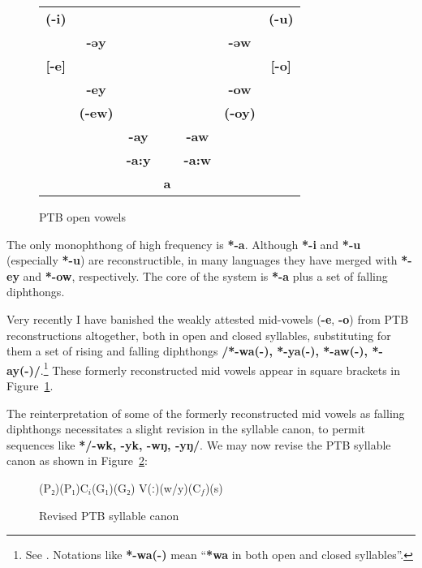 \begin{figure}[h!]
\centering
\begin{tabular}{ccccccc}
\textbf{(-i)} & & & & & & \textbf{(-u)}\\
 & \textbf{-əy} & & & & \textbf{-əw} & \\
\textbf{[-e]} & & & & & & \textbf{[-o]}\\
 & \textbf{-ey} & & & & \textbf{-ow} & \\
 & \textbf{(-ew)} & & & & \textbf{(-oy)} & \\
 & & \textbf{-ay} & & \textbf{-aw} & & \\
 & & \textbf{-a:y} & & \textbf{-a:w} & & \\
 & & & \textbf{a} & & & \\
\end{tabular}
\caption{PTB open vowels}
\label{fig:PTB_vowels}
\end{figure}

The only monophthong of high frequency is \textbf{*-a}. Although \textbf{*-i} and \textbf{*-u} (especially \textbf{*-u}) are reconstructible, in many languages they have merged with \textbf{*-ey} and \textbf{*-ow}, respectively. The core of the system is \textbf{*-a} plus a set of falling diphthongs.

Very recently I have banished the weakly attested mid-vowels (\textbf{-e}, \textbf{-o}) from PTB reconstructions altogether, both in open and closed syllables, substituting for them a set of rising and falling diphthongs \textbf{/*-wa(-), *-ya(-), *-aw(-), *-ay(-)/}.\footnote{See \citealt{JAM-PTBMV}. Notations like \textbf{*-wa(-)} mean “\textbf{*wa} in both open and closed syllables”.} These formerly reconstructed mid vowels appear in square brackets in Figure~\ref{fig:PTB_vowels}.

The reinterpretation of some of the formerly reconstructed mid vowels as falling diphthongs necessitates a slight revision in the syllable canon, to permit sequences like \textbf{*/-wk, -yk, -wŋ, -yŋ/}. We may now revise the PTB syllable canon as shown in Figure~\ref{fig:PTB_canon_new}:

\begin{figure}[h!]
\centering
(P₂)\hspace{2em}(P₁)\hspace{2em}$\textrm{C}_i$\hspace{2em}(G₁)\hspace{2em}(G₂)
\hspace{2em}V\hspace{2em}(ː)\hspace{2em}(w/y)\hspace{2em}($\textrm{C}_f$)\hspace{2em}(s)
\caption{Revised PTB syllable canon}
\label{fig:PTB_canon_new}
\end{figure}

